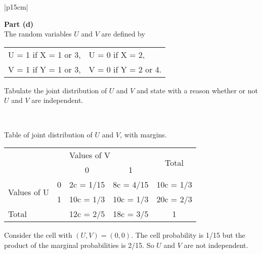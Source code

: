 \documentclass[a4paper,12pt]{article}
\begin{document}
	\newpage
	\begin{table}[ht!]
		
		\centering
		
		\begin{tabular}{|p{15cm}|}
			
			\hline
			
			\noindent
			\large
			
			\noindent \textbf{Part (d)}\\ \large
			The random variables $U$ and $V$ are defined by
			\begin{center}
				\begin{tabular}{ll}
					U = 1 if X = 1 or 3,& U = 0 if X = 2,\\
					V = 1 if Y = 1 or 3,& V = 0 if Y = 2 or 4.\\
				\end{tabular}
			\end{center}
			\large
			Tabulate the joint distribution of $U$ and $V$ and state with a reason whether or not $U$ and $V$ are independent.
			
			\\ \hline
			
		\end{tabular}
		
	\end{table}
	
	\large
	Table of joint distribution of $U$ and $V$, with margins.
	\begin{center}
		\begin{tabular}{cc|c|c|c|}
			\cline{3-5}
			&   & \multicolumn{2}{l|}{Values of V} & \multirow{2}{*}{Total} \\ \cline{3-4}
			&   & 0               & 1              &                        \\ \hline
			\multicolumn{1}{|l|}{\multirow{2}{*}{Values of U}} & 0 & 2c  =  1/15     & 8c  =  4/15    & 10c  =  1/3            \\ \cline{2-5} 
			\multicolumn{1}{|l|}{}                             & 1 & 10c = 1/3       & 10c = 1/3      & 20c = 2/3              \\ \hline
			\multicolumn{2}{|l|}{Total}                            & 12c = 2/5       & 18c = 3/5      & 1                      \\ \hline
		\end{tabular}
	\end{center}
	
	
	\noindent Consider the cell with $(U, V) = (0, 0)$. The cell probability is 1/15 but the product of the marginal probabilities is 2/15. So $U$ and $V$ are not independent.
	
\end{document}
